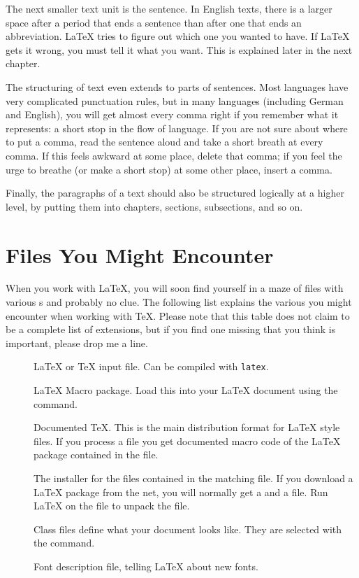 The next smaller text unit is the sentence.  In English texts, there is
a larger space after a period that ends a sentence than after one
that ends an abbreviation.  \LaTeX{} tries to figure out which one
you wanted to have.  If \LaTeX{} gets it wrong, you must tell it what
you want.  This is explained later in the next chapter.

The structuring of text even extends to parts of sentences.  Most
languages have very complicated punctuation rules, but in many
languages (including German and English), you will get almost every
comma right if you remember what it represents: a short stop in the
flow of language.  If you are not sure about where to put a comma,
read the sentence aloud and take a short breath at every comma.  If
this feels awkward at some place, delete that comma; if you feel the
urge to breathe (or make a short stop) at some other place, insert a
comma.

Finally, the paragraphs of a text should also be structured logically at a
higher level, by putting them into chapters, sections, subsections, and so on.

\section{Files You Might Encounter}

When you work with \LaTeX{}, you will soon find yourself in a maze of
files with various s and probably no clue. The following
list explains the various  you might encounter when
working with \TeX{}. Please note that this table does not claim to be
a complete list of extensions, but if you find one missing that you
think is important, please drop me a line.

\begin{description}

  \item[] \LaTeX{} or \TeX{} input file. Can be compiled with
    \texttt{latex}.
  \item[] \LaTeX{} Macro package. Load this
    into your \LaTeX{} document using the  command.
  \item[] Documented \TeX{}. This is the main distribution
    format for \LaTeX{} style files. If you process a  file you get
    documented macro code of the \LaTeX{} package contained in the 
    file.
  \item[] The installer for the files contained in the
    matching  file. If you download a \LaTeX{} package from the net,
    you will normally get a  and a  file. Run \LaTeX{} on the
     file to unpack the  file.
  \item[] Class files define what your document looks
    like. They are selected with the  command.
  \item[] Font description file, telling  \LaTeX{} about new fonts.
\end{description}

